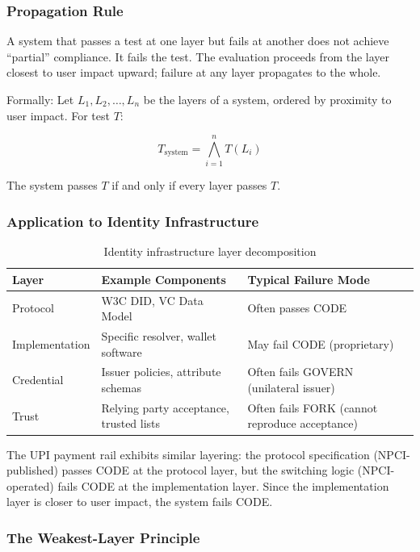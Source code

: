 \documentclass{article}
\begin{document}
\subsubsection{Propagation Rule}

A system that passes a test at one layer but fails at another does not achieve ``partial'' compliance. It fails the test. The evaluation proceeds from the layer closest to user impact upward; failure at any layer propagates to the whole.

Formally: Let $L_1, L_2, \ldots, L_n$ be the layers of a system, ordered by proximity to user impact. For test $T$:

\begin{equation}
T_{\text{system}} = \bigwedge_{i=1}^{n} T(L_i)
\end{equation}

The system passes $T$ if and only if every layer passes $T$.

\subsubsection{Application to Identity Infrastructure}

\begin{table}[htbp]
\centering
\small
\begin{tabular}{@{}llp{5cm}@{}}
\toprule
\textbf{Layer} & \textbf{Example Components} & \textbf{Typical Failure Mode} \\
\midrule
Protocol & W3C DID, VC Data Model & Often passes CODE \\
Implementation & Specific resolver, wallet software & May fail CODE (proprietary) \\
Credential & Issuer policies, attribute schemas & Often fails GOVERN (unilateral issuer) \\
Trust & Relying party acceptance, trusted lists & Often fails FORK (cannot reproduce acceptance) \\
\bottomrule
\end{tabular}
\caption{Identity infrastructure layer decomposition}
\label{tab:identity_layers}
\end{table}

The UPI payment rail exhibits similar layering: the protocol specification (NPCI-published) passes CODE at the protocol layer, but the switching logic (NPCI-operated) fails CODE at the implementation layer. Since the implementation layer is closer to user impact, the system fails CODE.

\subsubsection{The Weakest-Layer Principle}
\end{document}

